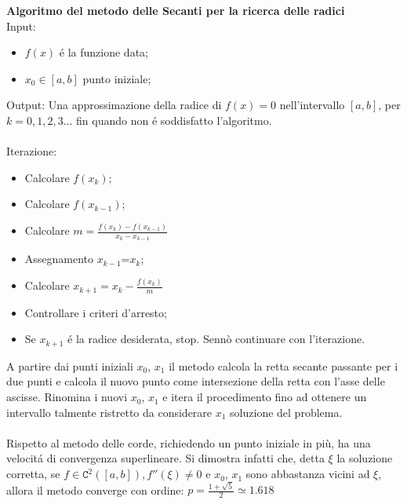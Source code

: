 \documentclass[12pt, letterpaper]{article}
\begin{document}
\textbf{Algoritmo del metodo delle Secanti per la ricerca delle radici}\\
Input:
\begin{itemize}
    \item $f(x)$ \'e la funzione data;
    \item $x_0 \in [a,b]$ punto iniziale;
\end{itemize}
Output: Una approssimazione della radice di $f(x)=0$ nell'intervallo $[a,b]$, per $k=0,1,2,3...$ fin quando non \'e soddisfatto l'algoritmo. \\~\\
Iterazione:
\begin{itemize}
    \item Calcolare $f(x_k)$;
    \item Calcolare $f(x_{k-1})$;
    \item Calcolare $m=\frac{f(x_k)-f(x_{k-1})}{x_k-x_{k-1}}$
    \item Assegnamento $x_{k-1}$=$x_k$;
    \item Calcolare $x_{k+1}=x_k-\frac{f(x_k)}{m}$
    \item Controllare i criteri d'arresto;
    \item Se $x_{k+1}$ \'e la radice desiderata, stop. Sennò continuare con l'iterazione.
\end{itemize}
A partire dai punti iniziali $x_0$, $x_1$ il metodo calcola la retta secante passante per i due punti e calcola il nuovo punto come
intersezione della retta con l'asse delle ascisse. Rinomina i nuovi $x_0$, $x_1$ e itera il procedimento fino ad
ottenere un intervallo talmente ristretto da considerare $x_1$ soluzione del problema. \\~\\
Rispetto al metodo delle corde, richiedendo un punto iniziale in più, ha una velocit\'a di convergenza superlineare. Si dimostra infatti che, detta $\xi$ la soluzione 
corretta, se $f \in \mathtt{C}^2([a,b]), f''(\xi)\neq 0$ e $x_0$, $x_1$ sono abbastanza vicini ad $\xi$, allora il metodo converge con ordine: $p=\frac{1+\sqrt{5}}{2}\simeq 1.618$

\newpage
\end{document}
